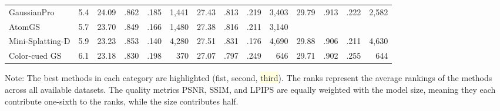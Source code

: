 {\begin{minipage}{\textheight}
\begin{adjustbox}{center}
\begin{tabular}{ll|lrrr|lrrr|lrrr}
GaussianPro & 5.4 & \cellcolor{lightorange}24.09 & \cellcolor{lightorange}.862 & .185 & 1,441 & 27.43 & .813 & .219 & 3,403 & 29.79 & \cellcolor{lightred}.913 & \cellcolor{lightorange}.222 & 2,582 \\
AtomGS & 5.7 & 23.70 & .849 & \cellcolor{lightyellow}.166 & 1,480 & 27.38 & .816 & \cellcolor{lightyellow}.211 & 3,140 &  &  &  &  \\
Mini-Splatting-D & 5.9 & 23.23 & \cellcolor{lightyellow}.853 & \cellcolor{lightred}.140 & 4,280 & 27.51 & \cellcolor{lightred}.831 & \cellcolor{lightred}.176 & 4,690 & 29.88 & .906 & \cellcolor{lightred}.211 & 4,630 \\
Color-cued GS & 6.1 & 23.18 & .830 & .198 & 370 & 27.07 & .797 & .249 & 646 & 29.71 & .902 & .255 & 644 \\
\bottomrule
\end{tabular}
        \end{adjustbox}
        \newline\newline
        \noindent Note: The best methods in each category are highlighted (\colorbox{lightred}{fist}, \colorbox{lightorange}{second}, \colorbox{lightyellow}{third}). The ranks represent the average rankings of the methods across all available datasets. The quality metrics PSNR, SSIM, and LPIPS are equally weighted with the model size, meaning they each contribute one-sixth to the ranks, while the size contributes half.

    \end{minipage}
}